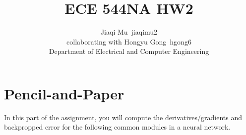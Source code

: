 \documentclass[11pt]{article}
\newcommand{\1}{\mathbf{1}}
\begin{document}
{\raggedright


\title{ECE 544NA HW2}%
\author{Jiaqi Mu~jiaqimu2 \\
collaborating with Hongyu Gong~hgong6 \\
[8pt]%
Department of Electrical and Computer Engineering} %

\maketitle

\section{Pencil-and-Paper\label{sec:1}}
In this part of the assignment, you will compute the derivatives/gradients and backpropped error for the following common modules in a neural network.

}
\end{document}
